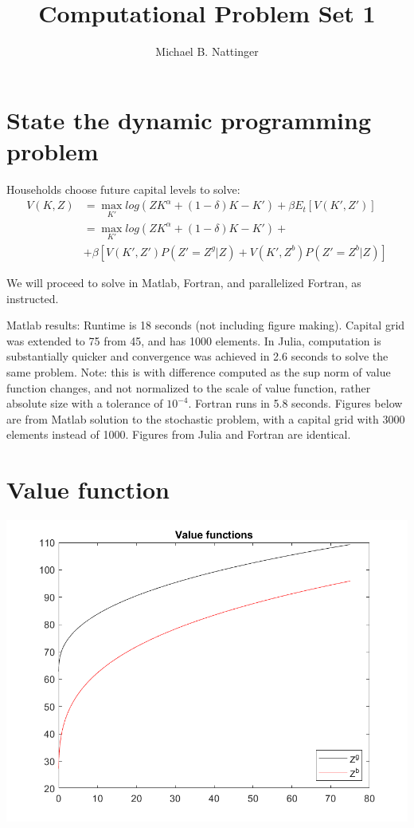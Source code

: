 \documentclass[11pt]{article} %
\title{Computational Problem Set 1}
\author{Michael B. Nattinger}
\begin{document}
\maketitle

\section{State the dynamic programming problem}
Households choose future capital levels to solve:
\begin{align*}
V(K,Z) &= \max_{K'} log(ZK^{\alpha} + (1-\delta)K - K') + \beta E_t[V(K',Z')]\\
&=  \max_{K'} log(ZK^{\alpha} + (1-\delta)K - K') + \\ &+ \beta[V(K',Z')P(Z' = Z^g|Z) + V(K',Z^b)P(Z' = Z^b|Z)]
\end{align*}

We will proceed to solve in Matlab, Fortran, and parallelized Fortran, as instructed.

Matlab results: Runtime is 18 seconds (not including figure making). Capital grid was extended to 75 from 45, and has 1000 elements. In Julia, computation is substantially quicker and convergence was achieved in 2.6 seconds to solve the same problem. Note: this is with difference computed as the sup norm of value function changes, and not normalized to the scale of value function, rather absolute size with a tolerance of $10^{-4}$. Fortran runs in 5.8 seconds. Figures below are from Matlab solution to the stochastic problem, with a capital grid with 3000 elements instead of 1000. Figures from Julia and Fortran are identical.

\section{Value function}
\includegraphics{value}
\end{document}
